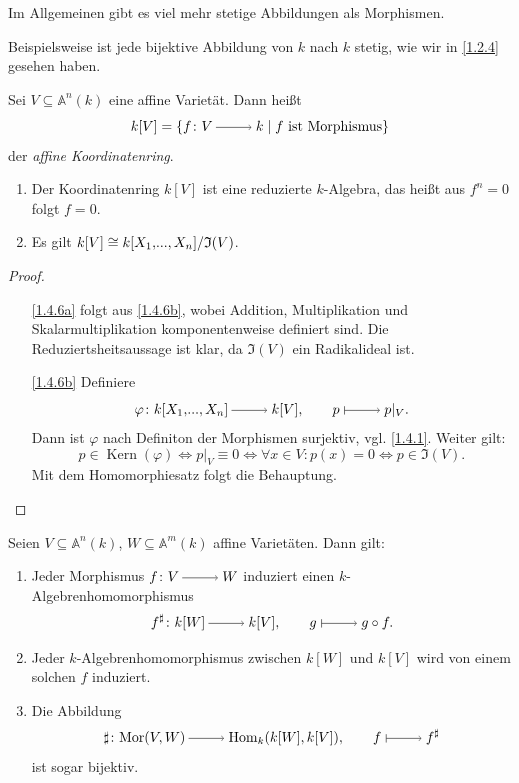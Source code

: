 \documentclass[a4paper,12pt,index=toc]{scrbook}
\theoremstyle{keinenummern} %
\def\A{\mathbb{A}}
\def\I{\mathfrak{I}}
\newcommand{\Hom}{\mathrm{Hom}}
\newcommand{\Mor}{\mathrm{Mor}}
\newcommand{\Kern}{\operatorname{Kern}}
\renewcommand{\phi}{\varphi}
\newcommand{\restrict}[1]{|_{#1}}
\renewcommand{\dotsc}{\ensuremath{\!...}}
\newcommand{\polyx}[1][n]{\ensuremath%
  [X_{1},\dotsc,X_{#1}]}
\begin{document}
\begin{w}
Im Allgemeinen gibt es viel mehr stetige Abbildungen als Morphismen. 

Beispielsweise ist jede bijektive Abbildung von $k$ nach $k$   stetig, wie wir in \cref{1.2.4} gesehen haben.

\end{w}\par

\begin{dfn}\label{1.4.5}
Sei $V\subseteq \A^n(k)$ eine affine Varietät. Dann heißt 
\[k[V]=\{f\colon V\ra k \mid f\text{ ist Morphismus\}}\]
 der \emph{affine Koordinatenring}.
\end{dfn}

\begin{bem}
\begin{enumerate}
\item{} Der Koordinatenring $k[V]$ ist eine reduzierte $k$-Algebra, das heißt aus $f^n=0$ folgt $f=0$.
\item{} Es gilt $k[V] \cong \Quotient{k\polyx}{\I(V)}$.
\end{enumerate}
\end{bem}

\begin{proof}
\begin{enumerate}
\item[\ref{1.4.6a}] folgt aus \ref{1.4.6b}, wobei Addition, Multiplikation und Skalarmultiplikation komponentenweise definiert sind. Die Reduziertsheitsaussage ist klar, da $\I(V)$ ein Radikalideal ist.
\item[\ref{1.4.6b}] Definiere
\[\phi\colon  k\polyx\ra k[V],  \qquad p\mapsto p\restrict{V}.\]
Dann ist $\phi$ nach Definiton der Morphismen surjektiv, vgl. \cref{1.4.1}. Weiter gilt:
\[p \in \Kern(\phi) \iff p\restrict{V} \equiv 0 \iff \forall x\in V\colon p(x)=0 \iff p\in \I(V).\] 
Mit dem Homomorphiesatz folgt die Behauptung. 
\end{enumerate}
\end{proof}

\begin{bem}\label{1.4.7} Seien $V\subseteq \A^n(k)$, $W\subseteq \A^m(k)$ affine Varietäten. Dann gilt:
\begin{enumerate}
\item{} Jeder Morphismus $f\colon V\ra W$ induziert einen $k$-Algebrenhomomorphismus
\[f^\sharp\colon  k[W]\ra k[V], \qquad g\mapsto g\circ f.\]
\item{} Jeder $k$-Algebrenhomomorphismus zwischen $k[W]$ und $k[V]$ wird von einem solchen $f$ induziert.
\item{} Die Abbildung 
\[\sharp\colon \Mor(V,W)\ra \Hom_k(k[W],k[V]), \qquad f\mapsto f^{\sharp}\]
ist sogar bijektiv.
\end{enumerate}
\end{bem}
\end{document}

